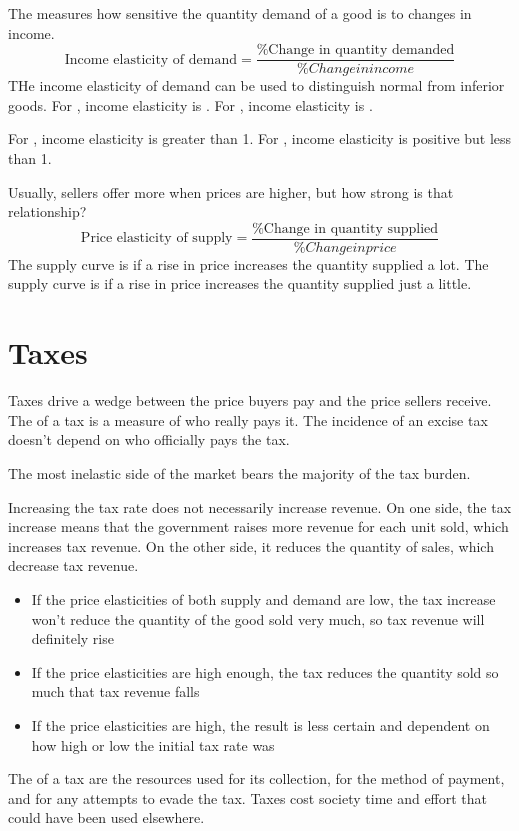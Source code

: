 \documentclass{article}
\begin{document}
The  measures how sensitive the quantity demand of a good is to changes in income. $$\textrm{Income elasticity of demand} = \frac{\textrm{\% Change in quantity demanded}}{{\% Change in income}}$$ THe income elasticity of demand can be used to distinguish normal from inferior goods. For , income elasticity is . For , income elasticity is . 

\begin{remark}
  For , income elasticity is greater than 1. For , income elasticity is positive but less than 1. 
\end{remark}

Usually, sellers offer more when prices are higher, but how strong is that relationship? $$\textrm{Price elasticity of supply} = \frac{\textrm{\% Change in quantity supplied}}{{\% Change in price}}$$ The supply curve is  if a rise in price increases the quantity supplied a lot. The supply curve is  if a rise in price increases the quantity supplied just a little. 

\section{Taxes}

Taxes drive a wedge between the price buyers pay and the price sellers receive. The  of a tax is a measure of who really pays it. The incidence of an excise tax doesn't depend on who officially pays the tax. 

\begin{remark}
  The most inelastic side of the market bears the majority of the tax burden.
\end{remark}

Increasing the tax rate does not necessarily increase revenue. On one side, the tax increase means that the government raises more revenue for each unit sold, which increases tax revenue. On the other side, it reduces the quantity of sales, which decrease tax revenue. 
\begin{itemize}
  \item If the price elasticities of both supply and demand are low, the tax increase won't reduce the quantity of the good sold very much, so tax revenue will definitely rise 
  \item If the price elasticities are high enough, the tax reduces the quantity sold so much that tax revenue falls 
  \item If the price elasticities are high, the result is less certain and dependent on how high or low the initial tax rate was
\end{itemize}
The  of a tax are the resources used for its collection, for the method of payment, and for any attempts to evade the tax. Taxes cost society time and effort that could have been used elsewhere. \\ 


 
\end{document}
